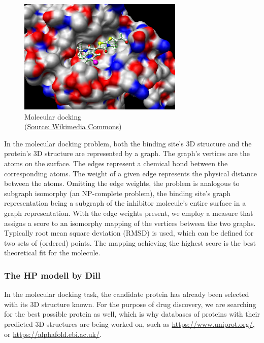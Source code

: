 \begin{figure}[H]
    \centering
    \includegraphics[width=0.7\textwidth]{figures/bioinformatics/molecular_docking.jpg}
    \caption{Molecular docking \\(\href{https://commons.wikimedia.org/wiki/File:Docking.jpg}{Source: Wikimedia Commons})}
\end{figure}

In the molecular docking problem, both the binding site's 3D structure and the protein's 3D structure are represented by a graph. The graph's vertices are the atoms on the surface. The edges represent a chemical bond between the corresponding atoms. The weight of a given edge represents the physical distance between the atoms. Omitting the edge weights, the problem is analogous to subgraph isomorphy (an NP-complete problem), the binding site's graph representation being a subgraph of the inhibitor molecule's entire surface in a graph representation. With the edge weights present, we employ a measure that assigns a score to an isomorphy mapping of the vertices between the two graphs. Typically root mean square deviation (RMSD) is used, which can be defined for two sets of (ordered) points. The mapping achieving the highest score is the best theoretical fit for the molecule.
 \cite{wang_protein_2021}
 
\subsubsection{The HP modell by Dill}

In the molecular docking task, the candidate protein has already been selected with its 3D structure known. For the purpose of drug discovery, we are searching for the best possible protein as well, which is why databases of proteins with their predicted 3D structures are being worked on, such as \href{https://www.uniprot.org/}{https://www.uniprot.org/}, or \href{https://alphafold.ebi.ac.uk/}{https://alphafold.ebi.ac.uk/}. \cite{senior_improved_2020}


